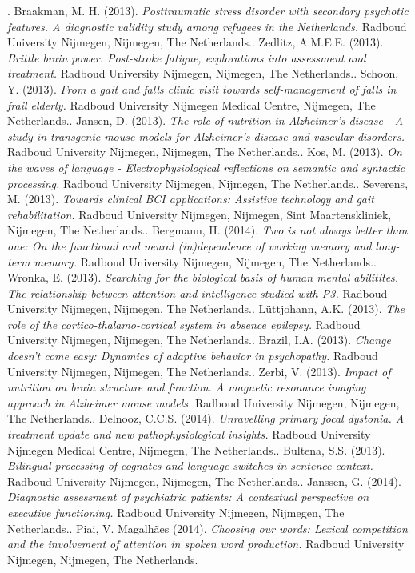 \npar {}.	Braakman, M. H. (2013). \emph{Posttraumatic stress disorder with secondary psychotic features. A diagnostic validity study among refugees in the Netherlands.} Radboud University Nijmegen, Nijmegen, The Netherlands.\npar {}.	Zedlitz, A.M.E.E. (2013). \emph{Brittle brain power. Post-stroke fatigue, explorations into assessment and treatment.} Radboud University Nijmegen, Nijmegen, The Netherlands.\npar {}.	Schoon, Y. (2013). \emph{From a gait and falls clinic visit towards self-management of falls in frail elderly.} Radboud University Nijmegen Medical Centre, Nijmegen, The Netherlands.\npar {}.	Jansen, D. (2013). \emph{The role of nutrition in Alzheimer's disease - A study in transgenic mouse models for Alzheimer's disease and vascular disorders.} Radboud University Nijmegen, Nijmegen, The Netherlands.\npar {}.	Kos, M. (2013). \emph{On the waves of language - Electrophysiological reflections on semantic and syntactic processing.} Radboud University Nijmegen, Nijmegen, The Netherlands.\npar {}.	Severens, M. (2013). \emph{Towards clinical BCI applications: Assistive technology and gait rehabilitation.} Radboud University Nijmegen, Nijmegen, Sint Maartenskliniek, Nijmegen, The Netherlands.\npar {}.	Bergmann, H. (2014). \emph{Two is not always better than one: On the functional and neural (in)dependence of working memory and long-term memory.} Radboud University Nijmegen, Nijmegen, The Netherlands.\npar {}.	Wronka, E. (2013). \emph{Searching for the biological basis of human mental abilitites. The relationship between attention and intelligence studied with P3.} Radboud University Nijmegen, Nijmegen, The Netherlands.\npar {}.	L\"uttjohann, A.K. (2013). \emph{The role of the cortico-thalamo-cortical system in absence epilepsy.} Radboud University Nijmegen, Nijmegen, The Netherlands.\npar {}.	Brazil, I.A. (2013). \emph{Change doesn't come easy: Dynamics of adaptive behavior in psychopathy.} Radboud University Nijmegen, Nijmegen, The Netherlands.\npar {}.	Zerbi, V. (2013). \emph{ Impact of nutrition on brain structure and function. A magnetic resonance imaging approach in Alzheimer mouse models.} Radboud University Nijmegen, Nijmegen, The Netherlands.\npar {}.	Delnooz, C.C.S. (2014). \emph{Unravelling primary focal dystonia. A treatment update and new pathophysiological insights.} Radboud University Nijmegen Medical Centre, Nijmegen, The Netherlands.\npar {}.	Bultena, S.S. (2013). \emph{Bilingual processing of cognates and language switches in sentence context.} Radboud University Nijmegen, Nijmegen, The Netherlands.\npar {}.	Janssen, G. (2014). \emph{Diagnostic assessment of psychiatric patients: A contextual perspective on executive functioning.} Radboud University Nijmegen, Nijmegen, The Netherlands.\npar {}.	Piai, V. Magalh\~aes (2014). \emph{Choosing our words: Lexical competition and the involvement of attention in spoken word production.} Radboud University Nijmegen, Nijmegen, The Netherlands.\npar \noindent \npar\npar \noindent \npar
